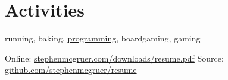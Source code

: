 \documentclass[10pt]{article}
\begin{document}

\vspace{0.75em}
\section{Activities}
running, baking, \href{https://github.com/stephenmcgruer}{programming}, boardgaming, gaming


\null\vfill
\footnotesize{
  Online:  \href{http://www.stephenmcgruer.com/downloads/resume.pdf}{stephenmcgruer.com/downloads/resume.pdf} \hfill
  Source:  \href{https://github.com/stephenmcgruer/resume}{github.com/stephenmcgruer/resume}
}
\end{document}
